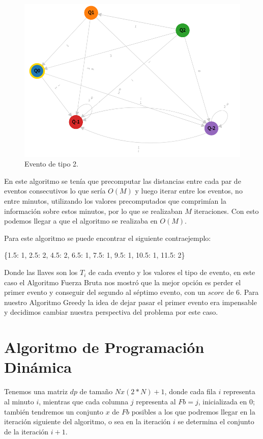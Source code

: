 \documentclass[12pt,a4paper]{report}
\begin{document}
\begin{figure}[h]  %
    \centering
    \includegraphics[width=\textwidth]{type 2.png}
    \caption{Evento de tipo 2.}
    \label{fig:type1}  %
\end{figure}

En este algoritmo se tenía que precomputar las distancias entre cada par de eventos consecutivos lo que sería $O(M)$ y luego iterar entre los eventos, no entre minutos, utilizando los valores precomputados que comprimían la información sobre estos minutos, por lo que se realizaban $M$ iteraciones. Con esto podemos llegar a que el algoritmo se realizaba en $O(M)$.

Para este algoritmo se puede encontrar el siguiente contraejemplo:

\smallskip

\{1.5: 1,   2.5: 2,   4.5: 2,   6.5: 1,   7.5: 1,   9.5: 1,   10.5: 1,   11.5: 2\}

Donde las llaves son los $T_i$ de cada evento y los valores el tipo de evento, en este caso el Algoritmo Fuerza Bruta nos mostró que la mejor opción es perder el primer evento y conseguir del segundo al séptimo evento, con un $score$ de 6. Para nuestro Algoritmo Greedy la idea de dejar pasar el primer evento era impensable y decidimos cambiar nuestra perspectiva del problema por este caso.

\section{Algoritmo de Programación Dinámica}

Tenemos una matriz $dp$ de tamaño $N x (2*N) + 1$, donde cada fila $i$ representa al minuto $i$, mientras que cada columna $j$ representa al $Fb = j$, inicializada en 0; también tendremos un conjunto $x$ de $Fb$ posibles a los que podremos llegar en la iteración siguiente del algoritmo, o sea en la iteración $i$ se determina el conjunto de la iteración $i+1$.
\end{document}
